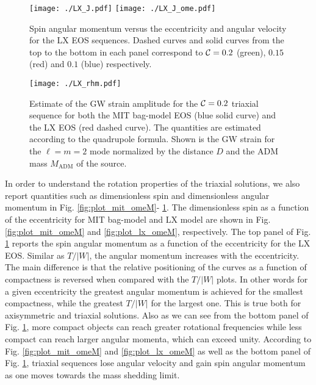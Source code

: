 \documentclass[twocolumn,superscriptaddress,showpacs,prd,aps,amsmath,amssymb,nofootinbib]{revtex4-1}
\begin{document}
\begin{figure*}
\begin{center}
\texttt{[image: ./LX\_J.pdf]}
\texttt{[image: ./LX\_J\_ome.pdf]}
\end{center}
\caption{Spin angular momentum versus the eccentricity and angular
  velocity for the LX EOS sequences. Dashed curves and solid curves from
  the top to the bottom in each panel correspond to $\mathcal{C}=0.2$ (green),
  $0.15$ (red) and $0.1$ (blue) respectively.}
\label{fig:plot_lx_J}
\end{figure*}

\begin{figure}
  \begin{center}
    \texttt{[image: ./LX\_rhm.pdf]}
  \end{center}
  \caption{Estimate of the GW strain amplitude for the $\mathcal{C}=0.2$
    triaxial sequence for both the MIT bag-model EOS (blue solid curve)
    and the LX EOS (red dashed curve). The quantities are estimated
    according to the quadrupole formula. Shown is the GW strain for the
    $\ell=m=2$ mode normalized by the distance $D$ and the ADM mass
    $M_\mathrm{ADM}$ of the source.}
  \label{fig:plot_gw_quad}
\end{figure}

In order to understand the rotation properties of the triaxial solutions,
we also report quantities such as dimensionless spin and dimensionless
angular momentum in Fig. \ref{fig:plot_mit_omeM}- \ref{fig:plot_lx_J}.
The dimensionless spin as a function of the eccentricity for MIT
bag-model and LX model are shown in Fig. \ref{fig:plot_mit_omeM} and
\ref{fig:plot_lx_omeM}, respectively.  The top panel of
Fig. \ref{fig:plot_lx_J} reports the spin angular momentum as a function
of the eccentricity for the LX EOS. Similar as $T/|W|$, the angular
momentum increases with the eccentricity. The main difference is that the
relative positioning of the curves as a function of compactness is
reversed when compared with the $T/|W|$ plots. In other words for a given
eccentricity the greatest angular momentum is achieved for the smallest
compactness, while the greatest $T/|W|$ for the largest one. This is true
both for axisymmetric and triaxial solutions. Also as we can see from the
bottom panel of Fig. \ref{fig:plot_lx_J}, more compact objects can reach
greater rotational frequencies while less compact can reach larger
angular momenta, which can exceed unity. According to
Fig. \ref{fig:plot_mit_omeM} and \ref{fig:plot_lx_omeM} as well as the
bottom panel of Fig. \ref{fig:plot_lx_J}, triaxial sequences lose angular
velocity and gain spin angular momentum as one moves towards the mass
shedding limit.
\end{document}
